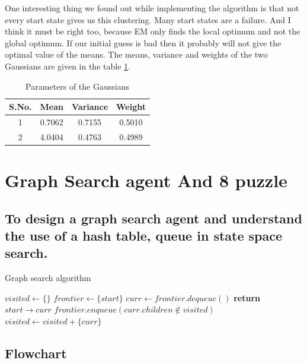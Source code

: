 \documentclass[journal, compsoc]{IEEEtran}
\begin{document}
One interesting thing we found out while implementing the algorithm is that not every start state gives us this clustering. Many start states are a failure.
And I think it must be right too, because EM only finds the local optimum and not the global optimum. If our initial guess is bad then it probably will not
give the optimal value of the means. The means, variance and weights of the two Gaussians are given in the table \ref{table:parameters}.

\begin{table}[!h]
\renewcommand{\arraystretch}{0.4}
\caption{Parameters of the Gaussians}
\label{table:parameters}
\centering
\begin{tabular}{|c|c|c|c|}
\hline
{\bfseries S.No.} & {\bfseries Mean} & {\bfseries Variance} & {\bfseries Weight}\\
\hline \hline
1 & 0.7062 & 0.7155 & 0.5010\\
\hline
2 & 4.0404 & 0.4763 & 0.4989\\
\hline
\end{tabular}
\end{table}

\section{Graph Search agent And 8 puzzle}
\subsection{To design a graph search agent and understand the use of a hash table, queue
in state space search.}

\begin{algorithm}
\caption{Graph search algorithm}
\label{bfsendwhile}
\begin{algorithmic}
\State $visited \gets \{\}$
\State $frontier \gets \{start\}$ 
\State $curr \gets frontier.dequeue()$
\State \textbf{return} $start \rightarrow curr$
\EndIf
\State $frontier.enqueue(curr.children \notin visited)$
\State $visited \gets visited + \{curr\}$
\EndWhile
\EndProcedure
\end{algorithmic}
\end{algorithm}

\subsection{Flowchart}
\end{document}
